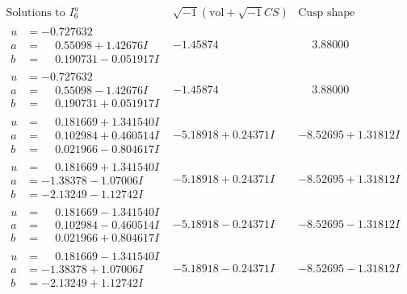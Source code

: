 \documentclass[1p]{elsarticle_modified}
\theoremstyle{definition}
\newcommand{\I}{\sqrt{-1}}
\begin{document}
$$\begin{array}{c|c|c}  
\text{Solutions to }I^u_{6}& \I (\text{vol} + \sqrt{-1}CS) & \text{Cusp shape}\\
 \hline 
\begin{aligned}
u &= -0.727632\phantom{ +0.000000I} \\
a &= \phantom{-}0.55098 + 1.42676 I \\
b &= \phantom{-}0.190731 - 0.051917 I\end{aligned}
 & -1.45874\phantom{ +0.000000I} & \phantom{-}3.88000\phantom{ +0.000000I} \\ \hline\begin{aligned}
u &= -0.727632\phantom{ +0.000000I} \\
a &= \phantom{-}0.55098 - 1.42676 I \\
b &= \phantom{-}0.190731 + 0.051917 I\end{aligned}
 & -1.45874\phantom{ +0.000000I} & \phantom{-}3.88000\phantom{ +0.000000I} \\ \hline\begin{aligned}
u &= \phantom{-}0.181669 + 1.341540 I \\
a &= \phantom{-}0.102984 + 0.460514 I \\
b &= \phantom{-}0.021966 - 0.804617 I\end{aligned}
 & -5.18918 + 0.24371 I & -8.52695 + 1.31812 I \\ \hline\begin{aligned}
u &= \phantom{-}0.181669 + 1.341540 I \\
a &= -1.38378 - 1.07006 I \\
b &= -2.13249 - 1.12742 I\end{aligned}
 & -5.18918 + 0.24371 I & -8.52695 + 1.31812 I \\ \hline\begin{aligned}
u &= \phantom{-}0.181669 - 1.341540 I \\
a &= \phantom{-}0.102984 - 0.460514 I \\
b &= \phantom{-}0.021966 + 0.804617 I\end{aligned}
 & -5.18918 - 0.24371 I & -8.52695 - 1.31812 I \\ \hline\begin{aligned}
u &= \phantom{-}0.181669 - 1.341540 I \\
a &= -1.38378 + 1.07006 I \\
b &= -2.13249 + 1.12742 I\end{aligned}
 & -5.18918 - 0.24371 I & -8.52695 - 1.31812 I \\ \hline\begin{aligned}

\end{aligned}
\end{array}$$
\end{document}
